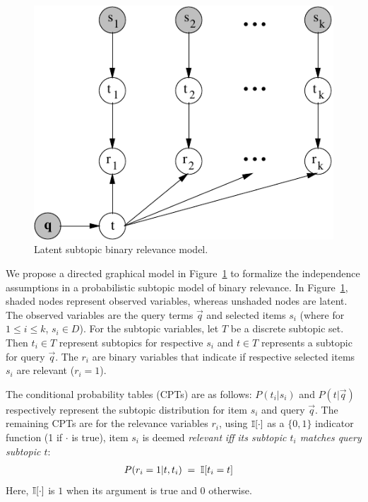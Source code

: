 \begin{figure}[t!]
\centerline{\includegraphics[scale = .8]{graphicalModel}}
\vspace{-2mm}
\caption{Latent subtopic binary relevance model.}
\vspace{-3mm}
\label{fig:gm}
\end{figure}
We propose a directed graphical model in Figure~\ref{fig:gm} to formalize the independence assumptions in a probabilistic subtopic model of binary relevance. In Figure~\ref{fig:gm}, shaded nodes represent observed variables, whereas unshaded nodes are latent. The observed variables are the query terms $\vec{q}$ and selected items $s_i$ (where for $1 \leq i \leq k$, $s_i\in D$).  For the subtopic variables, let $T$ be a discrete subtopic set.  Then $t_i \in T$ represent subtopics for respective
$s_i$ and $t \in T$ represents a subtopic for query $\vec{q}$.  The
$r_i$ are binary variables that indicate if respective selected
items $s_i$ are relevant ($r_i=1$).

The conditional probability tables (CPTs) are as follows: $P(t_i|s_i)$
and $P(t|\vec{q})$ respectively represent the subtopic distribution
for item $s_i$ and query $\vec{q}$.  The remaining CPTs are 
for the relevance variables $r_i$, using $\mathbb{I}[\cdot]$ as a $\{0,1\}$ indicator function (1 if $\cdot$ is true), item $s_i$ is deemed \emph{relevant} \emph{iff} \emph{its subtopic $t_i$ matches query subtopic $t$}:
\begin{align*}
P(r_{i}=1|t, t_{i}) & \; = \; \mathbb{I}[t_{i} = t]
\end{align*}
Here, $\mathbb{I}[\cdot]$ is $1$ when its argument is true and $0$ otherwise.

